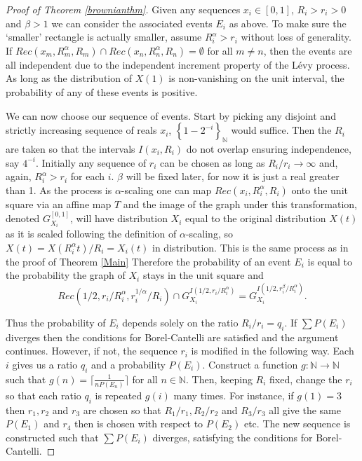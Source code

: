 \begin{proof}[Proof of Theorem \ref{brownianthm}]
Given any sequences $x_i \in [0,1]$, $R_i > r_i > 0$ and $\beta > 1$ we can consider the associated events $E_i$ as above. To make sure the `smaller' rectangle is actually smaller, assume $R_i^{\alpha} > r_i$ without loss of generality. If $Rec(x_m,R_m^{\alpha}, R_m) \cap Rec(x_n,R_n^{\alpha},R_n) = \emptyset$ for all $m\neq n$, then the events are all independent due to the independent increment property of the L\'evy process. As long as the distribution of $X(1)$ is non-vanishing on the unit interval, the probability of any of these events is positive.

We can now choose our sequence of events. Start by picking any disjoint and strictly increasing sequence of reals  $x_i$, $\left\{1-2^{-i} \right\}_{\mathbb{N}}$ would suffice. Then the $R_i$ are taken so that the intervals $I(x_i, R_i)$ do not overlap ensuring independence, say $4^{-i}$. Initially any sequence of $r_i$ can be chosen as long as $R_i/r_i \rightarrow \infty$ and, again, $R_i^{\alpha} > r_i$ for each $i$. $\beta$ will be fixed later, for now it is just a real greater than 1. As the process is $\alpha$-scaling one can map $Rec(x_i,R_i^{\alpha},R_i)$ onto the unit square via an affine map $T$ and the image of the graph under this transformation, denoted $G_{X_i}^{[0,1]}$, will have distribution $X_i$ equal to the original distribution $X(t)$ as it is scaled following the definition of $\alpha$-scaling, so $X(t) = X(R_i^\alpha t)/R_i = X_i(t)$ in distribution. This is the same process as in the proof of Theorem \ref{Main} Therefore the probability of an event $E_i$ is equal to the probability the graph of $X_i$ stays in the unit square and 
$$Rec(1/2,r_i/R_i^{\alpha} ,r_i^{1/\alpha}/R_i ) \cap G_{X_i}^{I(1/2, r_i/R_i^{\alpha})} = G_{X_i}^{I(1/2, r_i^{\beta}/R_i^{\alpha})}.$$

Thus the probability of $E_i$ depends solely on the ratio $R_i/r_i = q_i$. If $\sum P(E_i)$ diverges then the conditions for Borel-Cantelli are satisfied and the argument continues. However, if not, the sequence $r_i$ is modified in the following way. Each $i$ gives us a ratio $q_i$ and a probability $P(E_i)$. Construct a function $g \colon \mathbb{N} \rightarrow \mathbb{N}$ such that $g(n) = \lceil \frac{1}{nP(E_n)}\rceil$ for all $n\in \mathbb{N}$. Then, keeping $R_i$ fixed, change the $r_i$ so that each ratio $q_i$ is repeated $g(i)$ many times. For instance, if $g(1) = 3$ then $r_1,r_2$ and $r_3$ are chosen so that $R_1/r_1, R_2/r_2$ and $R_3/r_3$ all give the same $P(E_1)$ and $r_4$ then is chosen with respect to $P(E_2)$ etc. The new sequence is constructed such that $\sum P(E_i)$ diverges, satisfying the conditions for Borel-Cantelli.


\end{proof}
